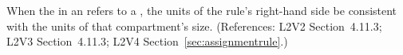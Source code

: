When the  in an \AssignmentRule refers to a \Compartment,
the units of the rule's right-hand side  be consistent with the units
of that compartment's size.  (References: L2V2 Section~4.11.3;
L2V3 Section~4.11.3; L2V4 Section~\ref{sec:assignmentrule}.)

